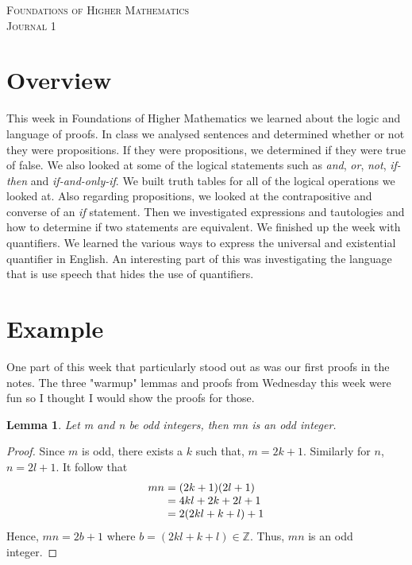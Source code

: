 \documentclass{article}
\newcommand{\classname}{
Foundations of Higher Mathematics
}
\newcommand{\journal}{
1
}
\begin{document}

\begin{center}
\textsc{\Large \classname}\\[.3cm]
\textsc{\Large Journal \journal}\\[1cm]
\end{center}

\section*{Overview}
This week in Foundations of Higher Mathematics we learned about the logic and language of proofs. In class we analysed sentences and determined whether or not they were propositions. If they were propositions, we determined if they were true of false. We also looked at some of the logical statements such as \textit{and}, \textit{or}, \textit{not}, \textit{if-then} and \textit{if-and-only-if}. We built truth tables for all of the logical operations we looked at. Also regarding propositions, we looked at the contrapositive and converse of an \textit{if} statement. Then we investigated expressions and tautologies and how to determine if two statements are equivalent. We finished up the week with quantifiers. We learned the various ways to express the universal and existential quantifier in English. An interesting part of this was investigating the language that is use speech that hides the use of quantifiers.

\section*{Example}
One part of this week that particularly stood out as was our first proofs in the notes. The three "warmup" lemmas and proofs from Wednesday this week were fun so I thought I would show the proofs for those.

\newtheorem{lem}{Lemma}

\begin{lem}
Let m and n be odd integers, then mn is an odd integer.
\end{lem}

\begin{proof}
Since $m$ is odd, there exists a $k$ such that, $m = 2k + 1$. Similarly for $n$, $n = 2l + 1$. It follow that 
\[
    \arraycolsep=1.5pt
    \begin{array}[t]{rl}
    mn     &= (2k+1)(2l+1) \\
           &= 4kl+2k+2l+1\\
        &= 2(2kl+k+l)+1\\      
    \end{array}
\]
Hence, $mn = 2b+1$ where $b = (2kl+k+l) \in \mathbb{Z}$. Thus, $mn$ is an odd integer.
\end{proof}
\end{document}
